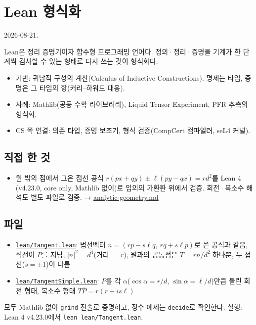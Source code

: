 \section{Lean 형식화}

2026-08-21.

Lean은 정리 증명기이자 함수형 프로그래밍 언어다. 정의·정리·증명을 기계가
한 단계씩 검사할 수 있는 형태로 다시 쓰는 것이 형식화다.

\begin{itemize}
\tightlist
\item
  기반: 귀납적 구성의 계산(Calculus of Inductive Constructions). 명제는
  타입, 증명은 그 타입의 항(커리--하워드 대응).
\item
  사례: Mathlib(공동 수학 라이브러리), Liquid Tensor Experiment, PFR
  추측의 형식화.
\item
  CS 쪽 연결: 의존 타입, 증명 보조기, 형식 검증(CompCert 컴파일러, seL4
  커널).
\end{itemize}

\subsection{직접 한 것}

\begin{itemize}
\tightlist
\item
  원 밖의 점에서 그은 접선 공식 \(r(px+qy)\pm\ell(py-qx)=rd^2\)를 Lean 4
  (v4.23.0, core only, Mathlib 없이)로 임의의 가환환 위에서 검증.
  회전·복소수 해석도 별도 파일로 검증. → \url{analytic-geometry.md}
\end{itemize}

\subsection{파일}

\begin{itemize}
\tightlist
\item
  \href{../lean/Tangent.lean}{\texttt{lean/Tangent.lean}}: 법선벡터
  \(n=(rp-s\ell q,\ rq+s\ell p)\)로 쓴 공식과 같음, 직선이 \(P\)를 지남,
  \(|n|^2=d^4\)(거리 \(=r\)), 원과의 공통점은 \(T=rn/d^2\) 하나뿐, 두
  접선(\(s=\pm1\))이 다름
\item
  \href{../lean/TangentSimple.lean}{\texttt{lean/TangentSimple.lean}}:
  \(P\)를 각 \(\alpha\)(\(\cos\alpha=r/d\), \(\sin\alpha=\ell/d\))만큼
  돌린 회전 형태, 복소수 형태 \(T\bar P=r(r+is\ell)\)
\end{itemize}

모두 Mathlib 없이 \texttt{grind} 전술로 증명하고, 정수 예제는
\texttt{decide}로 확인한다. 실행: Lean 4 v4.23.0에서
\texttt{lean\ lean/Tangent.lean}.
